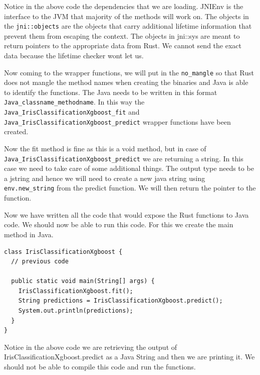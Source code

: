 \documentclass{book}
\begin{document}
Notice in the above code the dependencies that we are loading. JNIEnv is the interface to the JVM that majority of the methods will work on. The objects in the \lstinline{jni::objects} are the objects that carry additional lifetime information that prevent them from escaping the context. The objects in jni::sys are meant to return pointers to the appropriate data from Rust. We cannot send the exact data because the lifetime checker wont let us.

Now coming to the wrapper functions, we will put in the \lstinline{no_mangle} so that Rust does not mangle the method names when creating the binaries and Java is able to identify the functions. The Java needs to be written in this format \lstinline{Java_classname_methodname}. In this way the \lstinline{Java_IrisClassificationXgboost_fit} and \lstinline{Java_IrisClassificationXgboost_predict} wrapper functions have been created.

Now the fit method is fine as this is a void method, but in case of \lstinline{Java_IrisClassificationXgboost_predict} we are returning a string. In this case we need to take care of some additional things. The output type needs to be a jstring and hence we will need to create a new java string using \lstinline{env.new_string} from the predict function. We will then return the pointer to the function.
\label{par:wrapper_functions}

Now we have written all the code that would expose the Rust functions to Java code. We should now be able to run this code. For this we create the main method in Java.

\begin{lstlisting}[caption={chapter8/iris\_classification\_xgboost/iris\_classification\_library/src/lib.rs}, basicstyle=\small]
class IrisClassificationXgboost {
  // previous code

  public static void main(String[] args) {
    IrisClassificationXgboost.fit();
    String predictions = IrisClassificationXgboost.predict();
    System.out.println(predictions);
  }
}
\end{lstlisting}

Notice in the above code we are retrieving the output of IrisClassificationXgboost.predict as a Java String and then we are printing it. We should not be able to compile this code and run the functions.
\end{document}
